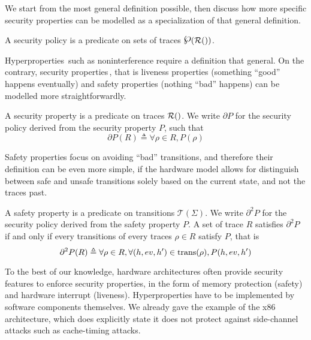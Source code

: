 We start from the most general definition possible, then discuss how more
specific security properties can be modelled as a specialization of that general
definition.

\begin{definition}
  \label{def:speccert:secpol}
  A security policy is a predicate on sets of traces
  $\powerset(\pathesLTS{Ez})$.
\end{definition}

Hyperproperties\,\cite{clarkson2010hyperproperties} such as noninterference
require a definition that general.
%
On the contrary, security properties\,\cite{schneider2000enforceable}, that is
liveness properties (something ``good'' happens eventually) and safety
properties (nothing ``bad'' happens) can be modelled more straightforwardly.

\begin{definition}
  A security property is a predicate on traces $\pathesLTS{Ez}$.
  We write $\partial P$ for the security policy derived from the security
  property $P$, such that
  \[
    \partial P(R) \triangleq \forall \rho \in R, P(\rho)
  \]
\end{definition}

Safety properties focus on avoiding ``bad'' transitions, and therefore their
definition can be even more simple, if the hardware model allows for distinguish
between safe and unsafe transitions solely based on the current state, and not
the traces past.

\begin{definition}
  \label{def:speccert:safetyprop}
  A safety property is a predicate on transitions $\mathcal{T}(\Sigma)$.
  We write $\partial^2 P$ for the security policy derived from the safety
  property $P$.
  A set of trace $R$ satisfies $\partial^2 P$ if and only if every transitions
  of every traces $\rho \in R$ satisfy $P$, that is
  \[
    \partial^2 P(R) \triangleq \forall \rho \in R, \forall (h, ev, h') \in
    \mathrm{trans}(\rho), P(h, ev, h')
  \]
\end{definition}

To the best of our knowledge, hardware architectures often provide security
features to enforce security properties, in the form of memory protection
(safety) and hardware interrupt (liveness).
%
Hyperproperties have to be implemented by software components themselves.
%
We already gave the example of the x86 architecture, which does explicitly state
it does not protect against side-channel attacks such as cache-timing attacks.

